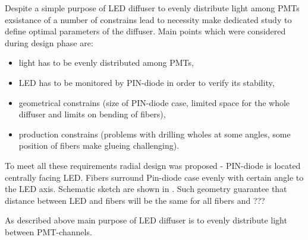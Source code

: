 

Despite a simple purpose of LED diffuser to evenly distribute light among PMTs exsistance of a number of constrains lead to necessity make dedicated study 
to define optimal parameters of the diffuser. Main points which were considered during design phase are:
\begin{itemize}
 \item light has to be evenly distributed among PMTs,
 \item LED has to be monitored by PIN-diode in order to verify its stability,
 \item geometrical constrains (size of PIN-diode case, limited space for the whole diffuser and limits on bending of fibers),
 \item production constrains (problems with drilling wholes at some angles, some position of fibers make glueing challenging).
\end{itemize}

To meet all these requirements radial design was proposed - PIN-diode is located centrally facing LED. Fibers surround Pin-diode case 
evenly with certain angle to the LED axis. Schematic sketch are shown in .
Such geometry guarantee that distance between LED and fibers will be the same for all fibers and ???
  
As described above main purpose of LED diffuser is to evenly distribute light between PMT-channels. 





